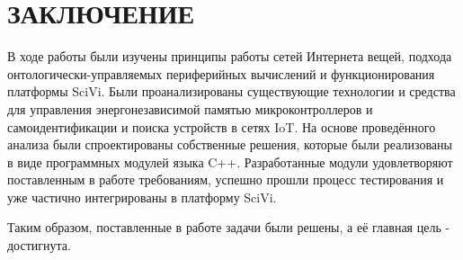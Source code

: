 \chapter*{ЗАКЛЮЧЕНИЕ}

В ходе работы были изучены принципы работы сетей Интернета вещей, подхода онтологически-управляемых периферийных вычислений и функционирования платформы SciVi.
Были проанализированы существующие технологии и средства для управления энергонезависимой памятью микроконтроллеров и самоидентификации и поиска устройств в сетях IoT.
На основе проведённого анализа были спроектированы собственные решения, которые были реализованы в виде программных модулей языка C++.
Разработанные модули удовлетворяют поставленным в работе требованиям, успешно прошли процесс тестирования и уже частично интегрированы в платформу SciVi.   

Таким образом, поставленные в работе задачи были решены, а её главная цель - достигнута.
